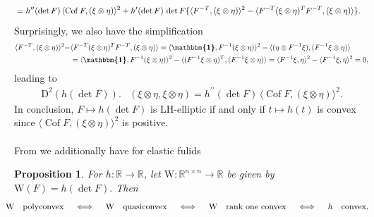 \documentclass[10pt]{article}
\newcounter{theoremCounter}
\numberwithin{theoremCounter}{section}
\theoremstyle{plain}
\newtheorem{prop}[theoremCounter]{Proposition}
\theoremstyle{definition}
\newcommand{\id}{{\boldsymbol{\mathbbm{1}}}}
\newcommand{\DD}{\mathrm{D}}
\newcommand{\WW}{\mathrm{W}}
\DeclareMathOperator{\Cof}{Cof}
\numberwithin{equation}{section}
\begin{document}
\begin{appendix}
\begin{align}
	&=h^{\prime\prime}(\det F)\, \langle \Cof F, (\xi\otimes\eta)\rangle^2+h^{\prime} (\det F)\, \det F \{\langle  F^{-T},(\xi\otimes\eta)\rangle^2-\langle
	F^{-T}(\xi\otimes\eta)^T F^{-T},(\xi\otimes\eta)\rangle\}.\notag
	\end{align}
Surprisingly, we also have the simplification
	\begin{align}
	\langle  F^{-T},(\xi\otimes\eta)\rangle^2-&\langle F^{-T}(\xi\otimes\eta)^T F^{-T},(\xi\otimes\eta)\rangle=
	\langle \id, F^{-1}(\xi\otimes\eta)\rangle^2-\langle (\eta\otimes F^{-1}\xi) ,(F^{-1}\xi\otimes\eta)\rangle\notag\\
	&=
	\langle \id, F^{-1}(\xi\otimes\eta)\rangle^2-\langle (F^{-1}\xi\otimes\eta)^T ,(F^{-1}\xi\otimes\eta)\rangle
	\notag=
	\langle  F^{-1}\xi,\eta\rangle^2-\langle F^{-1}\xi,\eta \rangle^2=0,
	\end{align}
leading to
	\begin{align}
	\DD^2(h(\det F)).&(\xi\otimes\eta,\xi\otimes\eta)=h^{\prime\prime}(\det F)\, \langle \Cof F, (\xi\otimes\eta)\rangle^2.
	\end{align}
In conclusion, $F\mapsto h(\det F)$ is LH-elliptic  if and only if $t\mapsto h(t)$ is convex since $\langle \Cof F, (\xi\otimes\eta)\rangle^2$ is
positive. \\
\\
From \cite[page 213]{Dacorogna08} we additionally have for elastic fulids
%
\begin{prop}\label{propDacdet}
For $h:\mathbb{R}\rightarrow\mathbb{R}$, let $\WW:\mathbb{R}^{n\times n}\rightarrow\mathbb{R}$ be given by $\WW(F)=h(\det F).$ Then
    \begin{align}\hspace{-4mm}
      \WW \quad \textnormal{polyconvex}\quad  \iff \quad \WW \quad \textnormal{quasiconvex}\quad \iff \quad  \WW \quad \textnormal{rank one convex}\quad \iff \quad h \quad \textnormal{convex}.
    \end{align}
   \end{prop}
%

\end{appendix}
\end{document}
